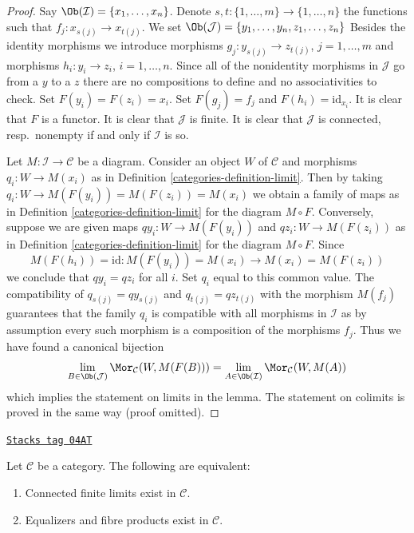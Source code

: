 \begin{proof}

Say $\Ob(\mathcal{I}) = \{x_1, \ldots, x_n\}$.
Denote $s, t : \{1, \ldots, m\} \to \{1, \ldots, n\}$ the functions
such that $f_j : x_{s(j)} \to x_{t(j)}$.
We set $\Ob(\mathcal{J}) = \{y_1, \ldots, y_n, z_1, \ldots, z_n\}$
Besides the identity morphisms we introduce morphisms
$g_j : y_{s(j)} \to z_{t(j)}$, $j = 1, \ldots, m$ and morphisms
$h_i : y_i \to z_i$, $i = 1, \ldots, n$. Since all of the nonidentity
morphisms in $\mathcal{J}$ go from a $y$ to a $z$ there are no
compositions to define and no associativities to check.
Set $F(y_i) = F(z_i) = x_i$. Set $F(g_j) = f_j$ and $F(h_i) = \text{id}_{x_i}$.
It is clear that $F$ is a functor.
It is clear that $\mathcal{J}$ is finite.
It is clear that $\mathcal{J}$ is connected, resp.\ nonempty
if and only if $\mathcal{I}$ is so.

\medskip\noindent
Let $M : \mathcal{I} \to \mathcal{C}$ be a diagram.
Consider an object $W$ of $\mathcal{C}$ and morphisms
$q_i : W \to M(x_i)$ as in
Definition \ref{categories-definition-limit}.
Then by taking $q_i : W \to M(F(y_i)) = M(F(z_i)) = M(x_i)$ we obtain
a family of maps as in
Definition \ref{categories-definition-limit}
for the diagram $M \circ F$.
Conversely, suppose we are given maps
$qy_i : W \to M(F(y_i))$ and $qz_i : W \to M(F(z_i))$
as in
Definition \ref{categories-definition-limit}
for the diagram $M \circ F$. Since
$$
M(F(h_i)) = \text{id} : M(F(y_i)) = M(x_i) \longrightarrow M(x_i) = M(F(z_i))
$$
we conclude that $qy_i = qz_i$ for all $i$. Set $q_i$ equal to this common
value. The compatibility of
$q_{s(j)} = qy_{s(j)}$ and $q_{t(j)} = qz_{t(j)}$ with the morphism
$M(f_j)$ guarantees that the family $q_i$ is compatible with all morphisms
in $\mathcal{I}$ as by assumption every such morphism is a composition
of the morphisms $f_j$. Thus we have found a canonical bijection
$$
\lim_{B \in \Ob(\mathcal{J})} \Mor_\mathcal{C}(W, M(F(B)))
=
\lim_{A \in \Ob(\mathcal{I})} \Mor_\mathcal{C}(W, M(A))
$$
which implies the statement on limits in the lemma. The statement on colimits
is proved in the same way (proof omitted).
\end{proof}

\begin{lemma}
\label{categories-lemma-fibre-products-equalizers-exist}
\href{https://stacks.math.columbia.edu/tag/04AT}{\texttt{Stacks tag 04AT}}

Let $\mathcal{C}$ be a category.
The following are equivalent:
\begin{enumerate}
\item Connected finite limits exist in $\mathcal{C}$.
\item Equalizers and fibre products exist in $\mathcal{C}$.
\end{enumerate}
\end{lemma}

